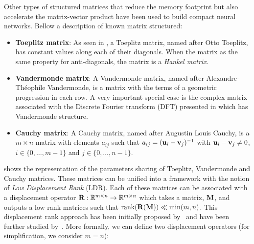 Other types of structured matrices that reduce the memory footprint but also accelerate the matrix-vector product have been used to build compact neural networks.
Bellow a description of known matrix structured:
\begin{itemize}
  \item \textbf{Toeplitz matrix}: As seen in , a Toeplitz matrix, named after Otto Toeplitz, has constant values along each of their diagonals. When the matrix as the same property for anti-diagonals, the matrix is a \emph{Hankel matrix}.
  \item \textbf{Vandermonde matrix}: A Vandermonde matrix, named after Alexandre-Théophile Vandermonde, is a matrix with the terms of a geometric progression in each row.  
    A very important special case is the complex matrix associated with the Discrete Fourier transform (DFT) presented in  which has Vandermonde structure.
  \item \textbf{Cauchy matrix}: A Cauchy matrix, named after Augustin Louis Cauchy, is a $m \times n$ matrix with elements $a_{ij}$ such that $a_{ij} = (\mathbf{u}_i - \mathbf{v}_j)^{-1}$ with $\mathbf{u}_i - \mathbf{v}_j \neq 0$, $i \in \{0,\dots,m-1\}$ and $j \in \{0,\dots,n-1\}$.
\end{itemize}
 shows the representation of the parameters sharing of Toeplitz, Vandermonde and Cauchy matrices.
These matrices can be unified into a framework with the notion of \emph{Low Displacement Rank} (LDR).
Each of these matrices can be associated with a displacement operator $\mathbf{R}: \mathbb{R}^{m \times n} \rightarrow \mathbb{R}^{m \times n}$ which takes a matrix, $\mathbf{M}$, and outputs a low rank matrices such that $\rank(\mathbf{R}(\mathbf{M})) \ll \min(m,n)$.
This displacement rank approach has been initially proposed by~\citet{kailath1979displacement} and have been further studied by~\citet{kailath1995displacement,pan2001structured}. 
More formally, we can define two displacement operators (for simplification, we consider $m = n$):
